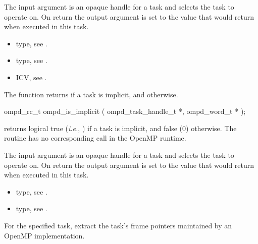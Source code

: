 \argdesc
The input argument  is an opaque handle for a task and selects the task to operate on.
On return the output argument  is set to the value that  would return when
executed in this task.
%

\crossreferences
\begin{itemize}
	\item {} type, see .
	\item {} type, see .
	\item {} ICV, see .
\end{itemize}

\label{ompd:ompd_is_implicit}
\summary
The  function returns  if a task is implicit, and  otherwise.

\format
\cspecificstart
\begin{boxedcode}
ompd\_rc\_t ompd\_is\_implicit (
  ompd\_task\_handle\_t  *,
  ompd\_word\_t        * 
); 
\end{boxedcode}
\cspecificend

\descr
{} returns logical true (\textit{i.e.}, )
if a task is implicit, and false (0) otherwise.
The routine has no corresponding call in the OpenMP runtime.

\argdesc
The input argument  is an opaque handle for a task and selects the task to operate on.
On return the output argument  is set to the value that  would return when
executed in this task.

\crossreferences
\begin{itemize}
	\item {} type, see .
	\item {} type, see .
\end{itemize}



%
\label{ompd:ompd_get_task_frame}
\summary
For the specified task, extract the task's frame pointers maintained by an OpenMP implementation.

